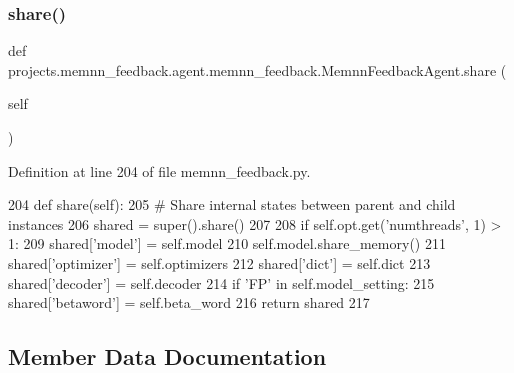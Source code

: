 \subsubsection{\texorpdfstring{share()}{share()}}
{\footnotesize\ttfamily def projects.\+memnn\+\_\+feedback.\+agent.\+memnn\+\_\+feedback.\+Memnn\+Feedback\+Agent.\+share (\begin{DoxyParamCaption}\item[{}]{self }\end{DoxyParamCaption})}



Definition at line 204 of file memnn\+\_\+feedback.\+py.


\begin{DoxyCode}
204     \textcolor{keyword}{def }share(self):
205         \textcolor{comment}{# Share internal states between parent and child instances}
206         shared = super().share()
207 
208         \textcolor{keywordflow}{if} self.opt.get(\textcolor{stringliteral}{'numthreads'}, 1) > 1:
209             shared[\textcolor{stringliteral}{'model'}] = self.model
210             self.model.share\_memory()
211             shared[\textcolor{stringliteral}{'optimizer'}] = self.optimizers
212             shared[\textcolor{stringliteral}{'dict'}] = self.dict
213             shared[\textcolor{stringliteral}{'decoder'}] = self.decoder
214             \textcolor{keywordflow}{if} \textcolor{stringliteral}{'FP'} \textcolor{keywordflow}{in} self.model\_setting:
215                 shared[\textcolor{stringliteral}{'betaword'}] = self.beta\_word
216         \textcolor{keywordflow}{return} shared
217 
\end{DoxyCode}


\subsection{Member Data Documentation}
\mbox{\label{classprojects_1_1memnn__feedback_1_1agent_1_1memnn__feedback_1_1MemnnFeedbackAgent_a6284cf09dc90bd4a9993b0f3c6ea01ab}} 
